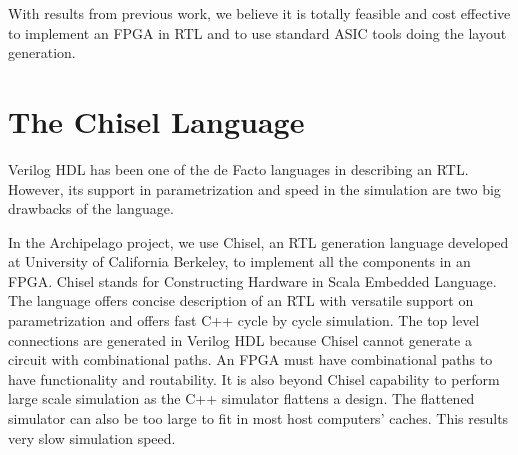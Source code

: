 With results from previous work, we believe it is totally feasible
and cost effective to implement an FPGA in RTL and 
to use standard ASIC tools doing the layout generation. \par

\section{The Chisel Language}
\label{sec:bkg_chisel}
Verilog HDL has been one of the de Facto languages in describing an RTL. However,
its support in parametrization and speed in the simulation are two big drawbacks of
the language. \par

In the Archipelago project, we use Chisel, an RTL generation language developed
at University of California Berkeley, to implement all the components in an FPGA.
\cite{Bachrach:2012:CCH:2228488.2228584}
Chisel stands for Constructing Hardware in Scala Embedded Language.
The language offers concise description of an RTL with versatile support on parametrization
and offers fast C++ cycle by cycle simulation. 
The top level connections are generated in Verilog HDL because Chisel cannot generate a circuit
with combinational paths. An FPGA must have combinational paths to have functionality and routability. It is
also beyond Chisel capability to perform large scale simulation as the C++ simulator flattens
a design. The flattened simulator can also be too large to fit in most host computers' caches. This 
 results very slow simulation speed. \par